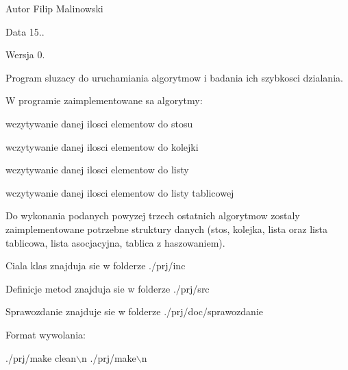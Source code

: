 \begin{DoxyAuthor}{Autor}
Filip Malinowski 
\end{DoxyAuthor}
\begin{DoxyDate}{Data}
15.. 
\end{DoxyDate}
\begin{DoxyVersion}{Wersja}
0.
\end{DoxyVersion}
Program sluzacy do uruchamiania algorytmow i badania ich szybkosci dzialania.\par
W programie zaimplementowane sa algorytmy\-:\par

\begin{DoxyItemize}
\item wczytywanie danej ilosci elementow do stosu\par

\item wczytywanie danej ilosci elementow do kolejki\par

\item wczytywanie danej ilosci elementow do listy\par

\item wczytywanie danej ilosci elementow do listy tablicowej
\end{DoxyItemize}

Do wykonania podanych powyzej trzech ostatnich algorytmow zostaly zaimplementowane potrzebne struktury danych (stos, kolejka, lista oraz lista tablicowa, lista asocjacyjna, tablica z haszowaniem).\par
\par
Ciala klas znajduja sie w folderze ./prj/inc\par
Definicje metod znajduja sie w folderze ./prj/src\par
Sprawozdanie znajduje sie w folderze ./prj/doc/sprawozdanie\par
\par
Format wywolania\-:\par

\begin{DoxyCode}
./prj/make clean\(\backslash\)n
./prj/make\(\backslash\)n
\end{DoxyCode}
 